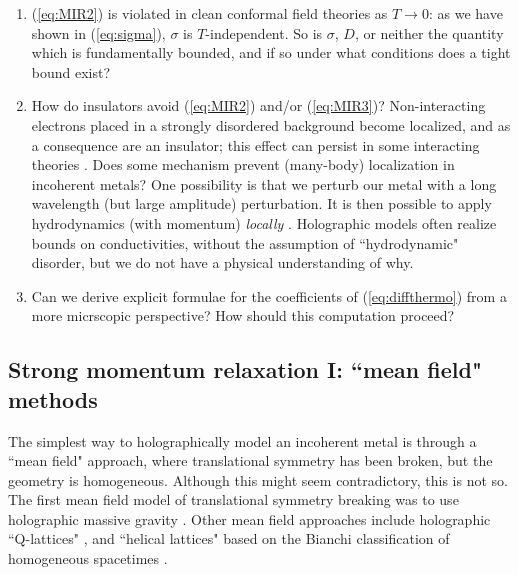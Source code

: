 \documentclass[10pt, oneside]{book}
\begin{document}
\begin{doublespace}
\begin{enumerate}
\item (\ref{eq:MIR2}) is violated in clean conformal field theories as $T\rightarrow 0$: as we have shown in (\ref{eq:sigma}), $\sigma$ is $T$-independent.   So is $\sigma$, $D$, or neither the quantity which is fundamentally bounded, and if so under what conditions does a tight bound exist?   


\item How do insulators avoid (\ref{eq:MIR2}) and/or (\ref{eq:MIR3})?   Non-interacting electrons placed in a strongly disordered background become localized, and as a consequence are an insulator;  this effect can persist in some interacting theories \cite{nandkishore}.  Does some mechanism prevent (many-body) localization in incoherent metals? One possibility is that we perturb our metal with a long wavelength (but large amplitude) perturbation.  It is then possible to apply hydrodynamics (with momentum) \emph{locally} \cite{Lucas:2015lna}.   Holographic models often realize bounds on conductivities, without the assumption of ``hydrodynamic" disorder, but we do not have a physical understanding of why.


\item Can we derive explicit formulae for the coefficients of (\ref{eq:diffthermo}) from a more micrscopic perspective?   How should this computation proceed?

\end{enumerate}

\subsection{Strong momentum relaxation I:  ``mean field" methods}
The simplest way to holographically model an incoherent metal is through a ``mean field" approach,  where translational symmetry has been broken,  but the geometry is homogeneous.    Although this might seem contradictory, this is not so.   The first mean field model of translational symmetry breaking was to use holographic massive gravity \cite{Vegh:2013sk, Davison:2013jba}.   Other mean field approaches include holographic ``Q-lattices" \cite{Donos:2013eha}, and ``helical lattices" \cite{Donos:2012js} based on the Bianchi classification of homogeneous spacetimes \cite{Iizuka:2012iv}.


\end{doublespace}
\end{document}
